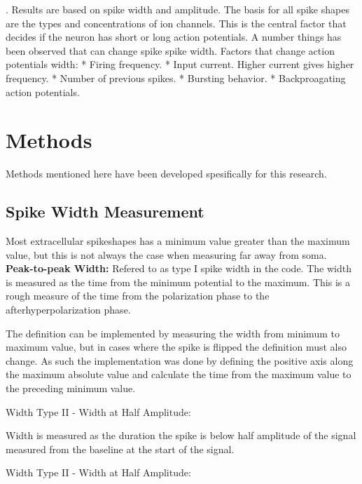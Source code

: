 \documentclass[altfont, fleqn]{uiophd}
\begin{document}
\cite{mountcastle_cortical_1969}.
Results are based on spike width and amplitude.
The basis for all spike shapes are the types and concentrations of
ion channels.
This is the central factor that decides if the neuron has short or long action potentials.
A number things has been observed that can change spike spike width.
Factors that change action potentials width:
* Firing frequency.
* Input current. Higher current gives higher frequency.
* Number of previous spikes.
* Bursting behavior.
* Backproagating action potentials.

\chapter{Methods}
Methods mentioned here have been developed spesifically for this research. 
\vspace{1em} 
\startcontents
{}
\section{Spike Width Measurement}
Most extracellular spikeshapes has a minimum value greater than the maximum 
value,
but this is not always the case when measuring
far away from soma. 
\\

\noindent 
{\bf Peak-to-peak Width:} Refered to as type I spike width in the code. 
The width is measured as the time from the minimum potential to the maximum. 
This is a rough measure of the time from the polarization phase to 
the afterhyperpolarization phase. 

The definition can be implemented by measuring the width from
minimum to maximum value, but in cases where the spike is flipped
the definition must also change. 
As such the implementation was done by defining the positive axis along 
the maximum absolute value and calculate the time from 
the maximum value to the preceding minimum value.
\newline

\noindent
Width Type II - Width at Half Amplitude:

Width is measured as the duration the spike is below half amplitude of the signal measured
from the baseline at the start of the signal. 
\newline

\noindent
Width Type II - Width at Half Amplitude:
\end{document}
